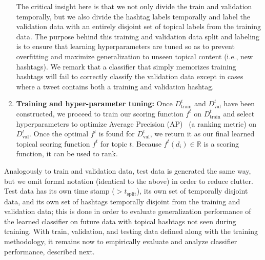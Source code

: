 \begin{enumerate}
The critical insight here is that we not only divide the train and validation
temporally, but we also divide the hashtag labels temporally and label the validation
data with an entirely disjoint set of topical labels from the training data.
The purpose behind this training and validation data split
and labeling is to ensure that learning hyperparameters are tuned so as
to prevent overfitting and maximize generalization to unseen topical
content (i.e., new hashtags).
We remark that a classifier that simply
memorizes training hashtags will fail to correctly classify the validation data except in 
cases where a tweet contains both a training and validation hashtag.  
\item {\bf Training and hyper-parameter tuning:}
Once $D^t_\mathrm{train}$ and $D^t_\mathrm{val}$ have been constructed,
we proceed to train our scoring function $f^t$ on $D^t_\mathrm{train}$ and
select hyperparameters to optimize Average Precision (AP)~\cite{manning_ir} (a ranking
metric) on
$D^t_\mathrm{val}$.  Once the optimal $f^t$ is found for $D^t_\mathrm{val}$,
we return it as our final learned topical scoring function $f^t$ for topic $t$.
Because $f^t(d_i) \in \mathbb{R}$ is a scoring function, it can be used to rank.
\end{enumerate}

Analogously to train and validation data, test data is generated the same way, but 
we omit formal notation (identical to the above) in order to reduce clutter.
Test data has its own time stamp ($> t_\mathrm{split}$), its own set of
temporally disjoint data, and its own set of hashtags 
temporally disjoint from the training and validation data; this is done in order to evaluate
generalization performance of the learned classifier on future data with topical hashtags
not seen during training.    
With train, validation, and testing data defined along with the training methodology,
it remains now to empirically evaluate and analyze classifier performance, 
described next.
